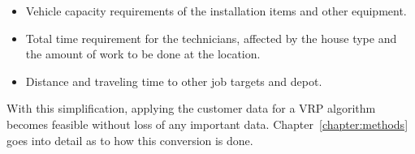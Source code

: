 \begin{itemize}
\item Vehicle capacity requirements of the installation items and other equipment.
\item Total time requirement for the technicians, affected by the house type and the amount of work to be done at the location.
\item Distance and traveling time to other job targets and depot. 
\end{itemize}

With this simplification, applying the customer data for a VRP algorithm becomes feasible without loss of any important data. Chapter~\ref{chapter:methods} goes into detail as to how this conversion is done.

